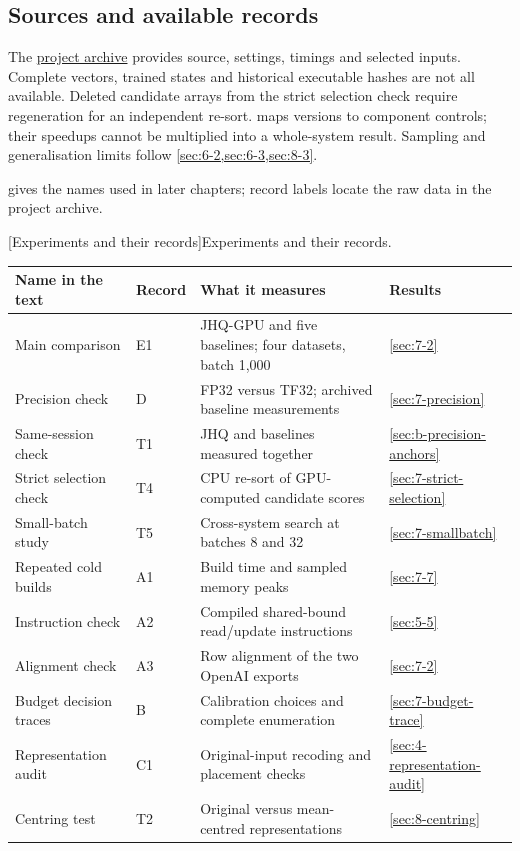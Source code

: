 \subsection{Sources and available records}
\label{app:reproducibility}
\label{sec:b-artifacts}
The \href{https://github.com/lrlorry/8800_report/blob/001579c9771759b672ef377b10dbc3dd959c7979/docs/artifact-access.md}{project archive}
provides source, settings, timings and selected inputs. Complete vectors,
trained states and historical executable hashes are not all available.
Deleted candidate arrays from the strict selection check require regeneration for an independent
re-sort.  maps versions to component controls;
their speedups cannot be multiplied into a whole-system result.
Sampling and generalisation limits follow \cref{sec:6-2,sec:6-3,sec:8-3}.

 gives the names used in later chapters; record labels locate the raw data in the project archive.

\par\medskip\noindent\begin{minipage}{\linewidth}
\centering\captionsetup{hypcap=false}
[Experiments and their records]{Experiments and their records.}
\label{tab:3-campaigns}
\footnotesize\setlength{\tabcolsep}{3pt}
\begin{tabularx}{\linewidth}{@{}>{\raggedright\arraybackslash}p{.24\linewidth}l>{\raggedright\arraybackslash}Xl@{}}
\toprule
Name in the text & Record & What it measures & Results \\
\midrule
Main comparison & E1 & JHQ-GPU and five baselines; four datasets, batch 1,000 & \cref{sec:7-2} \\
Precision check & D & FP32 versus TF32; archived baseline measurements & \cref{sec:7-precision} \\
Same-session check & T1 & JHQ and baselines measured together & \cref{sec:b-precision-anchors} \\
Strict selection check & T4 & CPU re-sort of GPU-computed candidate scores & \cref{sec:7-strict-selection} \\
Small-batch study & T5 & Cross-system search at batches 8 and 32 & \cref{sec:7-smallbatch} \\
Repeated cold builds & A1 & Build time and sampled memory peaks & \cref{sec:7-7} \\
Instruction check & A2 & Compiled shared-bound read/update instructions & \cref{sec:5-5} \\
Alignment check & A3 & Row alignment of the two OpenAI exports & \cref{sec:7-2} \\
Budget decision traces & B & Calibration choices and complete enumeration & \cref{sec:7-budget-trace} \\
Representation audit & C1 & Original-input recoding and placement checks & \cref{sec:4-representation-audit} \\
Centring test & T2 & Original versus mean-centred representations & \cref{sec:8-centring} \\
\bottomrule
\end{tabularx}
\end{minipage}\par\medskip

